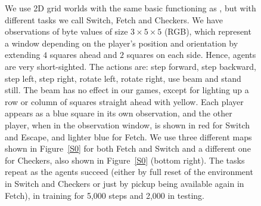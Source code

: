 \documentclass{article}
\begin{document}
\begin{figure}
We use 2D grid worlds with the same basic functioning as \citet{leibo2017}, but with different tasks we call Switch, Fetch and Checkers. We have observations of byte values of size $3\times5\times5$ (RGB), which represent a window depending on the player’s position and orientation by extending $4$ squares ahead
and $2$ squares on each side. Hence, agents are very short-sighted. The actions are: step forward, step backward,
step left, step right, rotate left, rotate right, use beam
and stand still. The beam has no effect in our games, except for lighting up a row or column of squares straight ahead with yellow. %
Each player appears as a  blue square in its own observation, and the other player, when in the observation window, is shown in red for Switch and Escape, and lighter blue for Fetch. We use three different maps shown in Figure~\ref{S0} for both Fetch and Switch and a different one for Checkers, also shown in Figure~\ref{S0} (bottom right). The tasks repeat as the agents succeed (either by full reset of the environment in Switch and Checkers or just by pickup being available again in Fetch), in training for 5,000 steps and 2,000 in testing.






\end{figure}
\end{document}
